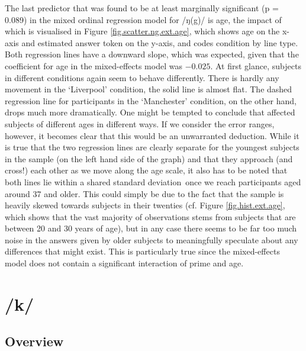 The last predictor that was found to be at least marginally significant (p = 0.089) in the mixed ordinal regression model for /ŋ(g)/ is age, the impact of which is visualised in Figure \ref{fig.scatter.ng.ext.age}, which shows age on the x-axis and estimated answer token on the y-axis, and codes  condition by line type.
Both regression lines have a downward slope, which was expected, given that the coefficient for age in the mixed-effects model was \ensuremath{-0.025}.
At first glance, subjects in different  conditions again seem to behave differently.
There is hardly any movement in the `Liverpool' condition, the solid line is almost flat.
The dashed regression line for participants in the `Manchester' condition, on the other hand, drops much more dramatically.
One might be tempted to conclude that  affected subjects of different ages in different ways.
If we consider the error ranges, however, it becomes clear that this would be an unwarranted deduction.
While it is true that the two regression lines are clearly separate for the youngest subjects in the sample (on the left hand side of the graph) and that they approach (and cross!) each other as we move along the age scale, it also has to be noted that both lines lie within a shared standard deviation\ once we reach participants aged around 37 and older.
This could simply be due to the fact that the sample is heavily skewed towards subjects in their twenties (cf. Figure \ref{fig.hist.ext.age}, which shows that the vast majority of observations stems from subjects that are between 20 and 30 years of age), but in any case there seems to be far too much noise in the answers given by older subjects to meaningfully speculate about any differences that might exist.
This is particularly true since the mixed-effects model does not contain a significant interaction of prime and age.

\section{/k/}
\label{sec.perc_res.k}
	\subsection{Overview}
	\label{sec.perc_res.k.overview}

